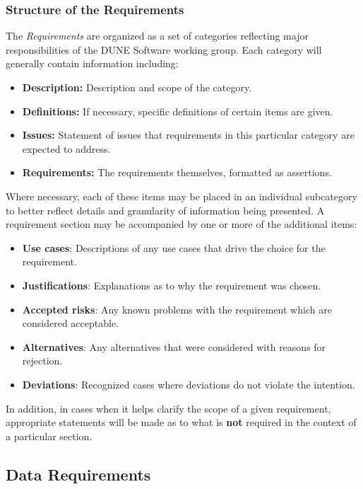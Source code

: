 \subsubsection{Structure of the Requirements}

The \textit{Requirements} are organized as a set of categories reflecting major responsibilities of the DUNE Software working group.  Each category will generally
contain information including:

\begin{itemize}
\item \textbf{Description:} Description and scope of the category.
\item \textbf{Definitions:} If necessary, specific definitions of certain items are given.
\item \textbf{Issues:} Statement of issues that requirements in this particular category are expected to address.
\item \textbf{Requirements:} The requirements themselves, formatted as assertions.
\end{itemize}

Where necessary, each of these items may be placed in an individual subcategory to better reflect details and granularity of information being presented. A requirement section may be accompanied by one or more of the additional items:

\begin{itemize}
\item \textbf{Use cases}: Descriptions of any use cases that drive the choice for the requirement.
\item \textbf{Justifications}: Explanations as to why the requirement was chosen.
\item \textbf{Accepted risks}: Any known problems with the requirement which are considered acceptable.
\item \textbf{Alternatives}: Any alternatives that were considered with reasons for rejection.
\item \textbf{Deviations}: Recognized cases where deviations do not violate the intention.
\end{itemize}

In addition, in cases when it helps clarify the scope of a given  requirement, appropriate statements will be made as to what is \textbf{not} required in the context of a particular section.


\newpage
\subsection{Data Requirements}
\label{sec:dunedata}

